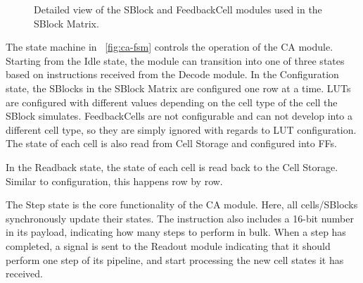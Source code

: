 \begin{figure}[ht]
  \qquad
  \caption[Cellular Automaton FeedbackCells]{
    Detailed view of the SBlock and FeedbackCell modules used in the
    SBlock Matrix.\label{fig:ca-celltypes}
  }
\end{figure}

The state machine in \figurename~\ref{fig:ca-fsm} controls the operation of the
CA module. Starting from the Idle state, the module can transition into one of
three states based on instructions received from the Decode module. In the
Configuration state, the SBlocks in the SBlock Matrix are configured one row at
a time. LUTs are configured with different values depending on the cell type of
the cell the SBlock simulates. FeedbackCells are not configurable and can not
develop into a different cell type, so they are simply ignored with regards to
LUT configuration. The state of each cell is also read from Cell Storage and
configured into FFs.

In the Readback state, the state of each cell is read back to the Cell Storage.
Similar to configuration, this happens row by row.

The Step state is the core functionality of the CA module. Here, all
cells/SBlocks synchronously update their states. The instruction also includes a
16-bit number in its payload, indicating how many steps to perform in bulk. When
a step has completed, a signal is sent to the Readout module indicating that it
should perform one step of its pipeline, and start processing the new cell
states it has received.


